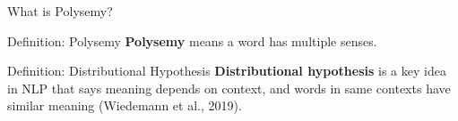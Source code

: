 % 
% 
%     
%     
%     
%     




\begin{frame}{What is Polysemy?}
      \small 
    
    \begin{definitionBlock}{Definition: Polysemy}
    \alert{\textbf{Polysemy}} means a word has multiple senses. 
    \end{definitionBlock}
    
    
    \begin{definitionBlock}{Definition: Distributional Hypothesis}
    \alert{\textbf{Distributional hypothesis}} is a key idea in NLP that says meaning depends on context, and words in same contexts have similar meaning (Wiedemann et al., 2019). 
    \end{definitionBlock}
\end{frame}





